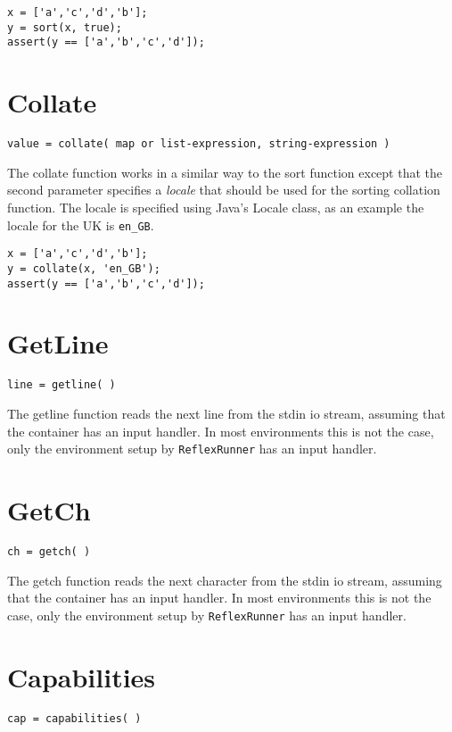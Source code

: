 \begin{lstlisting}[caption={Sort example}]
x = ['a','c','d','b'];
y = sort(x, true);
assert(y == ['a','b','c','d']);
\end{lstlisting}

\section{Collate}
\begin{Verbatim}
value = collate( map or list-expression, string-expression )
\end{Verbatim}

The collate function works in a similar way to the sort function except that the second
parameter specifies a \emph{locale} that should be used for the sorting collation function.
The locale is specified using Java's Locale class, as an example the locale for the UK is
\Verb+en_GB+.

\begin{lstlisting}[caption={Collate example}]
x = ['a','c','d','b'];
y = collate(x, 'en_GB');
assert(y == ['a','b','c','d']);
\end{lstlisting}

\section{GetLine}
\begin{Verbatim}
line = getline( )
\end{Verbatim}

The getline function reads the next line from the stdin io stream, assuming that the \Reflex container
has an input handler. In most environments this is not the case, only the environment setup by \Verb+ReflexRunner+ has an
input handler.

\section{GetCh}
\begin{Verbatim}
ch = getch( )
\end{Verbatim}

The getch function reads the next character from the stdin io stream, assuming that the \Reflex container
has an input handler. In most environments this is not the case, only the environment setup by \Verb+ReflexRunner+ has an
input handler.

\section{Capabilities}
\begin{Verbatim}
cap = capabilities( )
\end{Verbatim}

